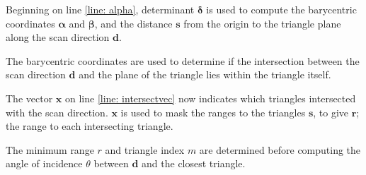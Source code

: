 	Beginning on line \ref{line: alpha}, determinant $\bm{\delta}$ is used to compute the barycentric coordinates $\bm{\alpha}$ and  $\bm{\beta}$, and the distance $\mathbf{s}$ from the origin to the triangle plane along the scan direction $\mathbf{d}$.
	
	The barycentric coordinates are used to determine if the intersection between the scan direction $\mathbf{d}$ and the plane of the triangle lies within the triangle itself. 
	
	The vector $\mathbf{x}$ on line \ref{line: intersectvec} now indicates which triangles intersected with the scan direction. $\mathbf{x}$ is used to mask the ranges to the triangles $\mathbf{s}$, to give $\mathbf{r}$; the range to each intersecting triangle. 
	
	The minimum range $r$ and triangle index $m$ are determined before computing the angle of incidence $\theta$ between $\mathbf{d}$ and the closest triangle.
	
